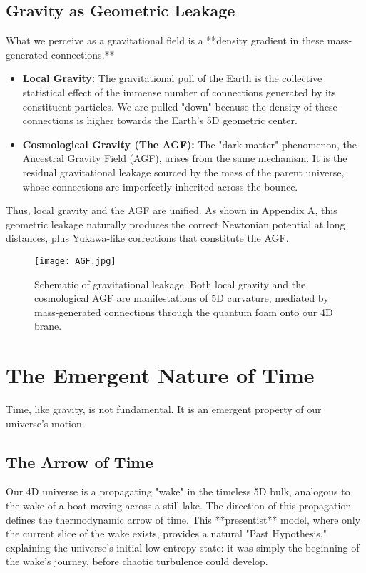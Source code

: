 \documentclass[aps,prd,onecolumn,10pt,superscriptaddress,nofootinbib,floatfix]{revtex4-2}
\begin{document}
\subsection{Gravity as Geometric Leakage}
What we perceive as a gravitational field is a **density gradient in these mass-generated connections.**
\begin{itemize}
    \item \textbf{Local Gravity:} The gravitational pull of the Earth is the collective statistical effect of the immense number of connections generated by its constituent particles. We are pulled "down" because the density of these connections is higher towards the Earth's 5D geometric center.
    \item \textbf{Cosmological Gravity (The AGF):} The "dark matter" phenomenon, the Ancestral Gravity Field (AGF), arises from the same mechanism. It is the residual gravitational leakage sourced by the mass of the parent universe, whose connections are imperfectly inherited across the bounce.
\end{itemize}
Thus, local gravity and the AGF are unified. As shown in Appendix A, this geometric leakage naturally produces the correct Newtonian potential at long distances, plus Yukawa-like corrections that constitute the AGF.

\begin{figure}[H]
  \centering
  \texttt{[image: AGF.jpg]}
  \caption{Schematic of gravitational leakage. Both local gravity and the cosmological AGF are manifestations of 5D curvature, mediated by mass-generated connections through the quantum foam onto our 4D brane.}
  \label{fig:agf_braneworld}
\end{figure}

\section{The Emergent Nature of Time}
Time, like gravity, is not fundamental. It is an emergent property of our universe's motion.

\subsection{The Arrow of Time}
Our 4D universe is a propagating "wake" in the timeless 5D bulk, analogous to the wake of a boat moving across a still lake. The direction of this propagation defines the thermodynamic arrow of time. This **presentist** model, where only the current slice of the wake exists, provides a natural "Past Hypothesis," explaining the universe's initial low-entropy state: it was simply the beginning of the wake's journey, before chaotic turbulence could develop.
\end{document}
